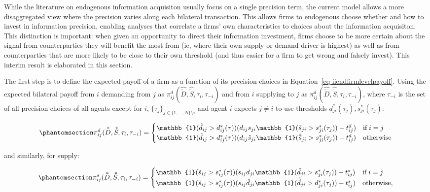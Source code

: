 \documentclass[
]{article}
\theoremstyle{definition}
\theoremstyle{plain}
\theoremstyle{remark}
\begin{document}
While the literature on endogenous information acquisiton usually focus
on a single precision term, the current model allows a more
disaggregated view where the precision varies along each bilateral
transaction. This allows firms to endogenous choose whether and how to
invest in information precision, enabling analyses that correlate a
firms' own characteristics to choices about the information acquisiton.
This distinction is important: when given an opportunity to direct their
information investment, firms choose to be more certain about the signal
from counterparties they will benefit the most from (ie, where their own
supply or demand driver is highest) as well as from counterparties that
are more likely to be close to their own threshold (and thus easier for
a firm to get wrong and falsely invest). This interim result is
elaborated in this section.

The first step is to define the expected payoff of a firm as a function
of its precision choices in Equation~\ref{eq-iiendfirmlevelpayoff}.
Using the expected bilateral payoff from \(i\) demanding from \(j\) as
\(\pi_{ij}^d(\hat{\tilde{D}}, \hat{\tilde{S}}, \tau_i, \tau_{-i})\) and
from \(i\) supplying to \(j\) as
\(\pi_{ij}^d(\hat{\tilde{D}}, \hat{\tilde{S}}, \tau_i, \tau_{-i})\),
where \(\tau_{-i}\) is the set of all precision choices of all agents
except for \(i\), \(\{\tau_j\}_{j \in \{1, \dots, N\}\setminus i}\) and
agent \(i\) expects \(j \neq i\) to use thresholds
\(d_{ji}^*(\tau_j), s_{ji}^*(\tau_j)\):

\begin{equation}\phantomsection\label{eq-bilateralpayoffD}{
\pi_{ij}^d(\hat{\tilde{D}}, \hat{\tilde{S}}, \tau_i, \tau_{-i}) = 
\begin{cases}
\mathbb{1}(\tilde{d}_{ij}>d_{ij}^*(\tau)) (d_{ij} s_{ji}\mathbb{1}(\tilde{s}_{ji}>s_{ji}^*(\tau_j)) - t_{ij}^d) & \text{if} \; i = j \\
\mathbb{1}(\tilde{d}_{ij}>d_{ij}^*(\tau)) (d_{ij} \hat{s}_{ji}\mathbb{1}(\hat{\tilde{s}}_{ji}>s_{ji}^*(\tau_j)) - t_{ij}^d) & \text{otherwise}
\end{cases}
}\end{equation}

and similarly, for supply:

\begin{equation}\phantomsection\label{eq-bilateralpayoffS}{
\pi_{ij}^s(\hat{\tilde{D}}, \hat{\tilde{S}}, \tau_i, \tau_{-i}) = 
\begin{cases}
\mathbb{1}(\tilde{s}_{ij}>s_{ij}^*(\tau)) (s_{ij} d_{ji}\mathbb{1}(\tilde{d}_{ji}>s_{ji}^*(\tau_j)) - t_{ij}^s) & \text{if} \; i = j \\
\mathbb{1}(\tilde{s}_{ij}>s_{ij}^*(\tau)) (s_{ij} \hat{d}_{ji}\mathbb{1}(\hat{\tilde{d}}_{ji}>d_{ji}^*(\tau_j)) - t_{ij}^s) & \text{otherwise},
\end{cases}
}\end{equation}
\end{document}
